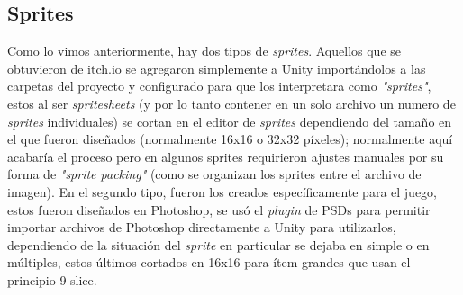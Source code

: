 \subsection{Sprites}
Como lo vimos anteriormente, hay dos tipos de \textit{sprites}. Aquellos que se obtuvieron de itch.io se agregaron simplemente a Unity importándolos a las carpetas del proyecto y configurado para que los interpretara como \textit{"sprites"}, estos al ser \textit{spritesheets} (y por lo tanto contener en un solo archivo un numero de \textit{sprites} individuales) se cortan en el editor de \textit{sprites} dependiendo del tamaño en el que fueron diseñados (normalmente 16x16 o 32x32 píxeles); normalmente aquí acabaría el proceso pero en algunos sprites requirieron ajustes manuales por su forma de \textit{"sprite packing"} (como se organizan los sprites entre el archivo de imagen). En el segundo tipo, fueron los creados específicamente para el juego, estos fueron diseñados en Photoshop, se usó el \textit{plugin} de PSDs para permitir importar archivos de Photoshop directamente a Unity para utilizarlos, dependiendo de la situación del \textit{sprite} en particular se dejaba en simple o en múltiples, estos últimos cortados en  16x16 para ítem grandes que usan el principio 9-slice.

